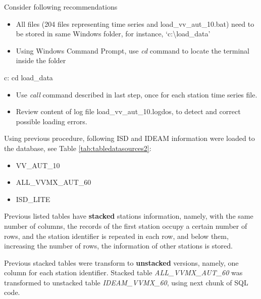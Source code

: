 \documentclass[12pt,oneside]{reedthesis}
\newenvironment{Shaded}{\begin{snugshade}}{\end{snugshade}}
\newcommand{\BuiltInTok}[1]{#1}
\newcommand{\ExtensionTok}[1]{#1}
\newcommand{\NormalTok}[1]{#1}
\providecommand{\tightlist}{%
  \setlength{\itemsep}{0pt}\setlength{\parskip}{0pt}}
\begin{document}
Consider following recommendations
\begin{itemize}
\tightlist
\item
  All files (204 files representing time series and load\_vv\_aut\_10.bat) need to be stored in same Windows folder, for instance, `c:\textbackslash load\_data'
\item
  Using Windows Command Prompt, use \emph{cd} command to locate the terminal inside the folder
\end{itemize}
\scriptsize

\vspace{0.4cm}
\begin{Shaded}
\begin{Highlighting}[]
        \ExtensionTok{c}\NormalTok{:}
        \BuiltInTok{cd}\NormalTok{ load_data}
\end{Highlighting}
\end{Shaded}
\normalsize
\begin{itemize}
\tightlist
\item
  Use \emph{call} command described in last step, once for each station time series file.
\item
  Review content of log file load\_vv\_aut\_10.logdos, to detect and correct possible loading errors.
\end{itemize}
Using previous procedure, following ISD and IDEAM information were loaded to the database, see Table \ref{tab:tabledatasources2}:
\begin{itemize}
\tightlist
\item
  VV\_AUT\_10
\item
  ALL\_VVMX\_AUT\_60
\item
  ISD\_LITE
\end{itemize}
Previous listed tables have \textbf{stacked} stations information, namely, with the same number of columns, the records of the first station occupy a certain number of rows, and the station identifier is repeated in each row, and below them, increasing the number of rows, the information of other stations is stored.

Previous stacked tables were transform to \textbf{unstacked} versions, namely, one column for each station identifier. Stacked table \emph{ALL\_VVMX\_AUT\_60} was transformed to unstacked table \emph{IDEAM\_VVMX\_60}, using next chunk of SQL code.

\scriptsize
\end{document}

